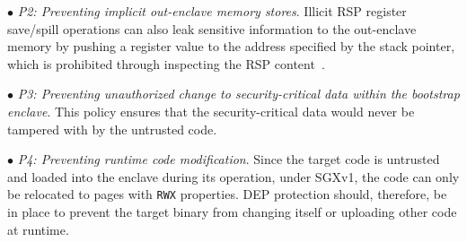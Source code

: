 \vspace{2pt}\noindent$\bullet$\textit{ P2: Preventing implicit out-enclave memory stores}. Illicit RSP register save/spill operations can also leak sensitive information to the out-enclave memory by pushing a register value to the address specified by the stack pointer, which is prohibited through inspecting the RSP content~\cite{wang2018detect}.  
    
\vspace{2pt}\noindent$\bullet$\textit{ P3: Preventing unauthorized change to security-critical data within the bootstrap enclave}. This policy ensures that the security-critical data would never be tampered with by the untrusted code.



\vspace{2pt}\noindent$\bullet$\textit{ P4: Preventing runtime code modification}. Since the target code is untrusted and loaded into the enclave during its operation, under SGXv1, the code can only be relocated to pages with \texttt{RWX} properties. DEP protection should, therefore, be in place to prevent the target binary from changing itself or uploading other code at runtime. 

